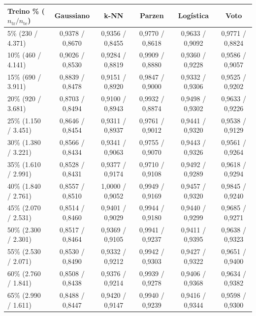 \documentclass[a4paper,11pt]{article}
\begin{document}
\begin{center}
\begin{minipage}{\linewidth}
\centering
{}
\footnotesize
\setlength{\tabcolsep}{2.5pt}
\renewcommand{\arraystretch}{1.18}
\begin{tabular}{l c c c c c}
\toprule
\textbf{Treino \% ($n_{\text{tr}} / n_{\text{te}}$)} & \textbf{Gaussiano} & \textbf{k-NN} & \textbf{Parzen} & \textbf{Logística} & \textbf{Voto} \\
\midrule
5\% (230 / 4.371) & 0,9378 / 0,8670 & 0,9356 / 0,8455 & 0,9770 / 0,8618 & 0,9633 / 0,9092 & 0,9771 / 0,8824 \\
10\% (460 / 4.141) & 0,9026 / 0,8530 & 0,9284 / 0,8819 & 0,9909 / 0,8880 & 0,9360 / 0,9228 & 0,9586 / 0,9057 \\
15\% (690 / 3.911) & 0,8839 / 0,8478 & 0,9151 / 0,8920 & 0,9847 / 0,9000 & 0,9332 / 0,9306 & 0,9525 / 0,9202 \\
20\% (920 / 3.681) & 0,8703 / 0,8494 & 0,9100 / 0,8943 & 0,9932 / 0,8874 & 0,9498 / 0,9302 & 0,9633 / 0,9226 \\
25\% (1.150 / 3.451) & 0,8646 / 0,8454 & 0,9311 / 0,8937 & 0,9761 / 0,9012 & 0,9441 / 0,9320 & 0,9538 / 0,9129 \\
30\% (1.380 / 3.221) & 0,8566 / 0,8434 & 0,9341 / 0,9063 & 0,9755 / 0,9070 & 0,9443 / 0,9326 & 0,9561 / 0,9264 \\
35\% (1.610 / 2.991) & 0,8528 / 0,8431 & 0,9377 / 0,9174 & 0,9710 / 0,9108 & 0,9492 / 0,9289 & 0,9618 / 0,9294 \\
40\% (1.840 / 2.761) & 0,8557 / 0,8510 & 1,0000 / 0,9052 & 0,9949 / 0,9169 & 0,9457 / 0,9320 & 0,9845 / 0,9240 \\
45\% (2.070 / 2.531) & 0,8514 / 0,8460 & 0,9401 / 0,9029 & 0,9944 / 0,9180 & 0,9440 / 0,9299 & 0,9685 / 0,9271 \\
50\% (2.300 / 2.301) & 0,8517 / 0,8464 & 0,9369 / 0,9105 & 0,9941 / 0,9237 & 0,9411 / 0,9395 & 0,9638 / 0,9323 \\
55\% (2.530 / 2.071) & 0,8530 / 0,8490 & 0,9332 / 0,9212 & 0,9942 / 0,9303 & 0,9427 / 0,9322 & 0,9651 / 0,9400 \\
60\% (2.760 / 1.841) & 0,8508 / 0,8438 & 0,9376 / 0,9214 & 0,9939 / 0,9278 & 0,9406 / 0,9368 & 0,9634 / 0,9382 \\
65\% (2.990 / 1.611) & 0,8488 / 0,8447 & 0,9420 / 0,9147 & 0,9940 / 0,9239 & 0,9416 / 0,9344 & 0,9598 / 0,9300 \\

\end{tabular}
\end{minipage}
\end{center}
\end{document}

